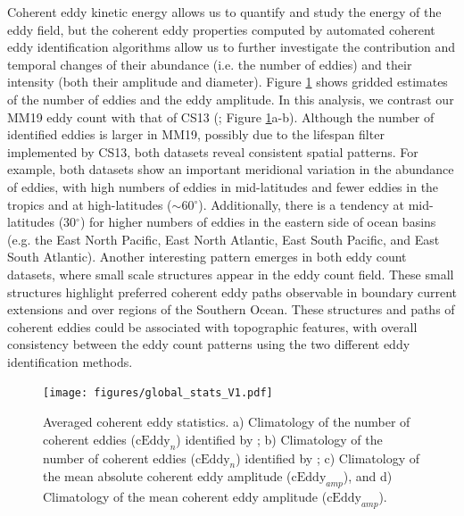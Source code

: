 \documentclass[draft,linenumbers]{agujournal2019}
\newcommand{\cEddy}{\textrm{cEddy}}
\begin{document}
	Coherent eddy kinetic energy allows us to quantify and study the energy of the eddy field, but the coherent eddy properties computed by automated coherent eddy identification algorithms allow us to further investigate the contribution and temporal changes of their abundance (i.e. the number of eddies) and their intensity (both their amplitude and diameter). 
	Figure \ref{fig:eddy_stats_climatology} shows gridded estimates of the number of eddies and the eddy amplitude. 
	In this analysis, we contrast our MM19 eddy count with that of CS13 (\citealp{Chelton_Global_2007}; Figure \ref{fig:eddy_stats_climatology}a-b). Although the number of identified eddies is larger in MM19, possibly due to the lifespan filter implemented by CS13, both datasets reveal consistent spatial patterns. 
	For example, both datasets show an important meridional variation in the abundance of eddies, with high numbers of eddies in mid-latitudes and fewer eddies in the tropics and at high-latitudes ($\sim$60$^\circ$). Additionally, there is a tendency at mid-latitudes (30$^\circ$) for higher numbers of eddies in the eastern side of ocean basins (e.g. the East North Pacific, East North Atlantic, East South Pacific, and East South Atlantic). 
	Another interesting pattern emerges in both eddy count datasets, where small scale structures appear in the eddy count field. 
	These small structures highlight preferred coherent eddy paths observable in boundary current extensions and over regions of the Southern Ocean. 
	These structures and paths of coherent eddies could be associated with topographic features, with overall consistency between the eddy count patterns using the two different eddy identification methods.
	
	\begin{figure}
	    \centering
	    \texttt{[image: figures/global\_stats\_V1.pdf]}
	    \caption{Averaged coherent eddy statistics. a) Climatology of the number of coherent eddies ($\cEddy_n$) identified by \citet{Chelton_Global_2007};  b) Climatology of the number of coherent eddies ($\cEddy_n$) identified by \citet{Martinez_TKE_2019}; c) Climatology of the mean absolute coherent eddy amplitude ($\cEddy_{amp}$), and d) Climatology of the mean coherent eddy amplitude ($\cEddy_{amp}$).}
	    \label{fig:eddy_stats_climatology}
	\end{figure}
	
\end{document}
